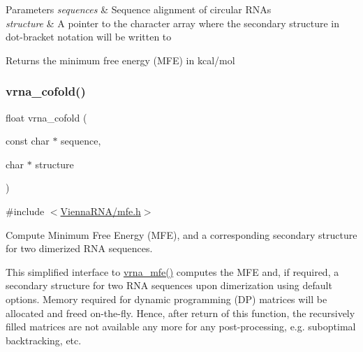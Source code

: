 \begin{DoxyParams}{Parameters}
{\em sequences} & Sequence alignment of circular R\+N\+As \\
\hline
{\em structure} & A pointer to the character array where the secondary structure in dot-\/bracket notation will be written to \\
\hline
\end{DoxyParams}
\begin{DoxyReturn}{Returns}
the minimum free energy (M\+FE) in kcal/mol 
\end{DoxyReturn}
\mbox{\label{group__mfe__global_ga9ef3a297201dbf838a8daff2b45c0c82}} 
\subsubsection{\texorpdfstring{vrna\_cofold()}{vrna\_cofold()}}
{\footnotesize\ttfamily float vrna\+\_\+cofold (\begin{DoxyParamCaption}\item[{const char $\ast$}]{sequence,  }\item[{char $\ast$}]{structure }\end{DoxyParamCaption})}



{\ttfamily \#include $<$\mbox{\hyperlink{mfe_8h}{Vienna\+R\+N\+A/mfe.\+h}}$>$}



Compute Minimum Free Energy (M\+FE), and a corresponding secondary structure for two dimerized R\+NA sequences. 

This simplified interface to \mbox{\hyperlink{group__mfe__global_gabd3b147371ccf25c577f88bbbaf159fd}{vrna\+\_\+mfe()}} computes the M\+FE and, if required, a secondary structure for two R\+NA sequences upon dimerization using default options. Memory required for dynamic programming (DP) matrices will be allocated and free\textquotesingle{}d on-\/the-\/fly. Hence, after return of this function, the recursively filled matrices are not available any more for any post-\/processing, e.\+g. suboptimal backtracking, etc.

